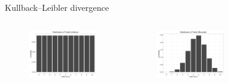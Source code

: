 \begin{frame}[fragile]{Kullback–Leibler divergence}
		\begin{columns}[onlytextwidth]
		\begin{figure}

			\includegraphics[height=0.5\textheight]{f3.png}
		\end{figure}
		\begin{figure}

			\includegraphics[height=0.5\textheight]{f4.png}
		\end{figure}
		\begin{figure}


\end{figure}
\end{columns}
\end{frame}
